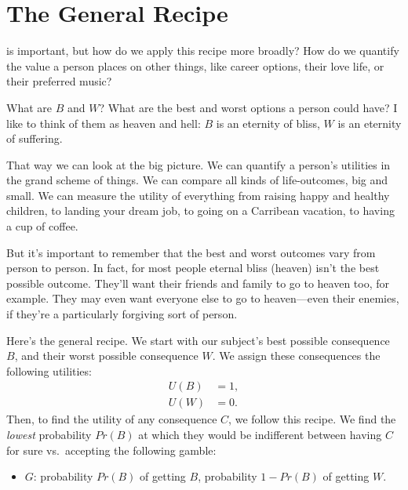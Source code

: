 \documentclass[justified]{tufte-book}
\providecommand{\tightlist}{%
  \setlength{\itemsep}{0pt}\setlength{\parskip}{0pt}}
\renewcommand{\u}{U}
\newcommand{\p}{Pr}
\theoremstyle{definition}
\theoremstyle{definition}
\theoremstyle{definition}
\theoremstyle{remark}
\begin{document}
\hypertarget{the-general-recipe}{%
\section{The General Recipe}\label{the-general-recipe}}

 is important, but how do we apply this recipe more
broadly? How do we quantify the value a person places on other things,
like career options, their love life, or their preferred music?

\begin{marginfigure}
What are \(B\) and \(W\)? What are the best and worst options a person
could have? I like to think of them as heaven and hell: \(B\) is an
eternity of bliss, \(W\) is an eternity of suffering.

That way we can look at the big picture. We can quantify a person's
utilities in the grand scheme of things. We can compare all kinds of
life-outcomes, big and small. We can measure the utility of everything
from raising happy and healthy children, to landing your dream job, to
going on a Carribean vacation, to having a cup of coffee.

But it's important to remember that the best and worst outcomes vary
from person to person. In fact, for most people eternal bliss (heaven)
isn't the best possible outcome. They'll want their friends and family
to go to heaven too, for example. They may even want everyone else to go
to heaven---even their enemies, if they're a particularly forgiving sort
of person.
\end{marginfigure}

Here's the general recipe. We start with our subject's best possible
consequence \(B\), and their worst possible consequence \(W\). We assign
these consequences the following utilities: \[
  \begin{aligned}
    \u(B) &= 1,\\
    \u(W) &= 0.
  \end{aligned}
\] Then, to find the utility of any consequence \(C\), we follow this
recipe. We find the \emph{lowest} probability \(\p(B)\) at which they
would be indifferent between having \(C\) for sure vs.~accepting the
following gamble:

\begin{itemize}
\tightlist
\item
  \(G\): probability \(\p(B)\) of getting \(B\), probability \(1-\p(B)\)
  of getting \(W\).
\end{itemize}
\end{document}
